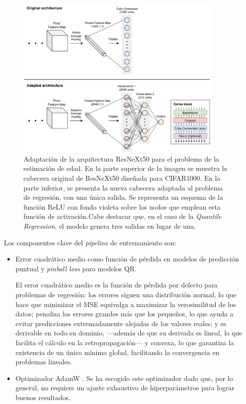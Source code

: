 \begin{figure}[htbp]
    \centering
    \includegraphics[width=0.9\textwidth]{capitulos/cap_05/imagenes/adapted_ResNext50.png}
    \caption[
        Adaptación de la arquitectura ResNeXt50 para el problema de la estimación de edad. 
    ]{
        Adaptación de la arquitectura ResNeXt50 para el problema de la estimación de edad. En la parte superior de la imagen se muestra la cabecera original de ResNeXt50 diseñada para CIFAR1000. En la parte inferior, se presenta la nueva cabecera adaptada al problema de regresión, con una única salida. Se representa un esquema de la función ReLU con fondo violeta sobre los nodos que emplean esta función de activación.Cabe destacar que, en el caso de la \textit{Quantile Regression}, el modelo genera tres salidas en lugar de una. 
    } 
    \label{fig:adapted_resnext50}
\end{figure}


Los componentes clave del \textit{pipeline} de entrenamiento son:

\begin{itemize}

    \item Error cuadrático medio como función de pérdida en modelos de predicción puntual y \textit{pinball loss} para modelos \acrshort{QR}. 

    El error cuadrático medio es la función de pérdida por defecto para problemas de regresión: los errores siguen una distribución normal, lo que hace que minimizar el MSE equivalga a maximizar la verosimilitud de los datos; penaliza los errores grandes más que los pequeños, lo que ayuda a evitar predicciones extremadamente alejadas de los valores reales; y es derivable en todo su dominio, ---además de que su derivada es lineal, lo que facilita el cálculo en la retropropagación--- y convexa, lo que garantiza la existencia de un único mínimo global, facilitando la convergencia en problemas lineales. 
        
    \item Optimizador AdamW \cite{loshchilov2017}. Se ha escogido este optimizador dado que, por lo general, no requiere un ajuste exhaustivo de hiperparámetros para lograr buenos resultados. 
    
\end{itemize}

